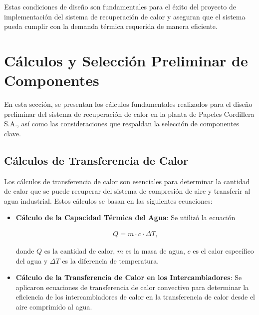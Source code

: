 \documentclass[11pt,a4paper]{article}  %
\begin{document}
Estas condiciones de diseño son fundamentales para el éxito del proyecto de implementación del sistema de recuperación de calor y aseguran que el sistema pueda cumplir con la demanda térmica requerida de manera eficiente.

\section{Cálculos y Selección Preliminar de Componentes}

En esta sección, se presentan los cálculos fundamentales realizados para el diseño preliminar del sistema de recuperación de calor en la planta de Papeles Cordillera S.A., así como las consideraciones que respaldan la selección de componentes clave.

\subsection{Cálculos de Transferencia de Calor}
Los cálculos de transferencia de calor son esenciales para determinar la cantidad de calor que se puede recuperar del sistema de compresión de aire y transferir al agua industrial. Estos cálculos se basan en las siguientes ecuaciones:

\begin{itemize}
    \item \textbf{Cálculo de la Capacidad Térmica del Agua}: Se utilizó la ecuación 

\begin{align*}
Q = m \cdot c \cdot \Delta T, 
\end{align*}    
    
donde \(Q\) es la cantidad de calor, \(m\) es la masa de agua, \(c\) es el calor específico del agua y \(\Delta T\) es la diferencia de temperatura.
    
    \item \textbf{Cálculo de la Transferencia de Calor en los Intercambiadores}: Se aplicaron ecuaciones de transferencia de calor convectivo para determinar la eficiencia de los intercambiadores de calor en la transferencia de calor desde el aire comprimido al agua.
\end{itemize}
\end{document}
